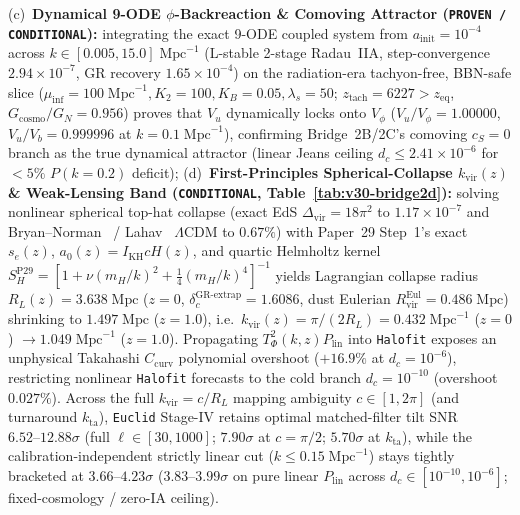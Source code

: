 \documentclass[11pt,a4paper]{article}
\begin{document}
\begin{enumerate}
    (c)~\textbf{Dynamical 9-ODE $\phi$-Backreaction \& Comoving Attractor (\texttt{PROVEN / CONDITIONAL}):} integrating the exact 9-ODE coupled system from $a_{\mathrm{init}}=10^{-4}$ across $k \in [0.005, 15.0]\;\mathrm{Mpc}^{-1}$ (L-stable 2-stage Radau~IIA, step-convergence $2.94\times 10^{-7}$, GR recovery $1.65\times 10^{-4}$) on the radiation-era tachyon-free, BBN-safe slice ($\mu_{\mathrm{inf}}=100\;\mathrm{Mpc}^{-1}, K_2=100, K_B=0.05, \lambda_s=50$; $z_{\mathrm{tach}}=6227 > z_{\mathrm{eq}}$, $G_{\mathrm{cosmo}}/G_N = 0.956$) proves that $V_u$ dynamically locks onto $V_\phi$ ($V_u/V_\phi = 1.00000$, $V_u/V_b = 0.999996$ at $k=0.1\;\mathrm{Mpc}^{-1}$), confirming Bridge~2B/2C's comoving $c_S = 0$ branch as the true dynamical attractor (linear Jeans ceiling $d_c \le 2.41\times 10^{-6}$ for $<5\%$ $P(k=0.2)$ deficit);
    (d)~\textbf{First-Principles Spherical-Collapse $k_{\mathrm{vir}}(z)$ \& Weak-Lensing Band (\texttt{CONDITIONAL}, Table~\ref{tab:v30-bridge2d}):} solving nonlinear spherical top-hat collapse (exact EdS $\Delta_{\mathrm{vir}}=18\pi^2$ to $1.17\times 10^{-7}$ and Bryan--Norman~\cite{BryanNorman1998} / Lahav~\cite{Lahav1991} $\Lambda$CDM to $0.67\%$) with Paper~29 Step~1's exact $s_e(z)$, $a_0(z)=I_{\mathrm{KH}}cH(z)$, and quartic Helmholtz kernel $S_H^{\mathrm{P29}} = [1 + \nu(m_H/k)^2 + \frac{1}{4}(m_H/k)^4]^{-1}$ yields Lagrangian collapse radius $R_L(z) = 3.638\;\mathrm{Mpc}$ ($z=0$, $\delta_c^{\mathrm{GR\text{-}extrap}} = 1.6086$, dust Eulerian $R_{\mathrm{vir}}^{\mathrm{Eul}} = 0.486\;\mathrm{Mpc}$) shrinking to $1.497\;\mathrm{Mpc}$ ($z=1.0$), i.e.\ $k_{\mathrm{vir}}(z) = \pi/(2 R_L) = 0.432\;\mathrm{Mpc}^{-1}$ ($z=0$) $\to 1.049\;\mathrm{Mpc}^{-1}$ ($z=1.0$). Propagating $T_\Phi^2(k,z)P_{\mathrm{lin}}$ into \texttt{Halofit} exposes an unphysical Takahashi $C_{\mathrm{curv}}$ polynomial overshoot ($+16.9\%$ at $d_c=10^{-6}$), restricting nonlinear \texttt{Halofit} forecasts to the cold branch $d_c = 10^{-10}$ (overshoot $0.027\%$). Across the full $k_{\mathrm{vir}} = c/R_L$ mapping ambiguity $c \in [1, 2\pi]$ (and turnaround $k_{\mathrm{ta}}$), \texttt{Euclid} Stage-IV retains optimal matched-filter tilt SNR \textbf{$6.52\text{--}12.88\sigma$} (full $\ell\in[30,1000]$; $7.90\sigma$ at $c=\pi/2$; $5.70\sigma$ at $k_{\mathrm{ta}}$), while the calibration-independent strictly linear cut ($k \le 0.15\;\mathrm{Mpc}^{-1}$) stays tightly bracketed at \textbf{$3.66\text{--}4.23\sigma$} ($3.83\text{--}3.99\sigma$ on pure linear $P_{\mathrm{lin}}$ across $d_c \in [10^{-10}, 10^{-6}]$; fixed-cosmology / zero-IA ceiling).
\end{enumerate}
\end{document}
